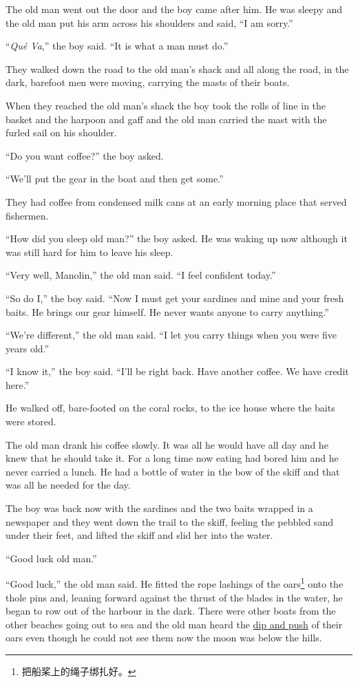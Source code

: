 \documentclass[fontset=ubuntu]{ctexrep}
\begin{document}
The old man went out the door and the boy came after him. He was sleepy and
the old man put his arm across his shoulders and said, ``I am sorry.''

``\emph{Qué Va},'' the boy said. ``It is what a man must do.''

They walked down the road to the old man's shack and all along the road, in
the dark, barefoot men were moving, carrying the masts of their boats.

When they \gls{reached} the old man's shack the boy took the rolls of line
in the basket and the harpoon and gaff and the old man carried the mast with
the furled sail on his shoulder.

``Do you want coffee?'' the boy asked.

``We'll put the gear in the boat and then get some.''

They had coffee from \gls{condensed} milk cans at an early morning place that served fishermen.

``How did you sleep old man?'' the boy asked. He was waking up now \gls{although}
it was still hard for him to leave his sleep.

``Very well, Manolin,'' the old man said. ``I feel confident today.''

``So do I,'' the boy said. ``Now I must get your sardines and mine and your
fresh baits. He brings our gear himself. He never wants anyone to carry
anything.''

``We're different,'' the old man said. ``I let you carry things when you were five years old.''

``I know it,'' the boy said. ``I'll be right back. Have another coffee. We have \gls{credit} here.''

He walked off, bare-footed on the \gls{coral} rocks, to the ice house where
the baits were stored.

The old man drank his coffee slowly. It was all he would have all day and he
knew that he should take it. For a long time now eating had bored him and he
never carried a lunch. He had a bottle of water in the bow of the
skiff and that was all he needed for the day.

The boy was back now with the sardines and the two baits wrapped in a
newspaper and they went down the \gls{trail} to the skiff, feeling the
\gls{pebbled} sand under their feet, and \gls{lifted} the skiff and
\gls{slid} her into the water.

``Good luck old man.''

``Good luck,'' the old man said. He fitted the rope lashings of the
\glspl{oar}\footnote{把船桨上的绳子绑扎好。} onto the \gls{thole}
\glspl{pin} and, \gls{leaning} forward against the \gls{thrust} of the
\glspl{blade} in the water, he began to row out of the harbour in the dark.
There were other boats from the other beaches going out to sea and the old
man heard the \uline{\gls{dip} and push} of their oars even though he could
not see them now the moon was below the hills.
\end{document}
